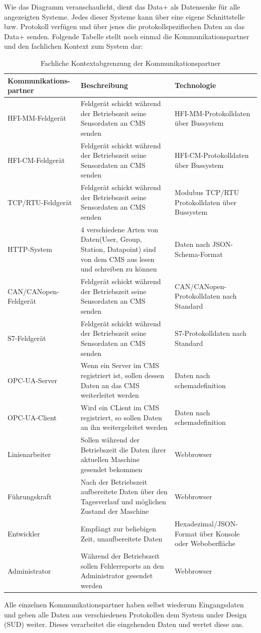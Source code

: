 Wie das Diagramm veranschaulicht, dient das Data+ als Datensenke für alle angezeigten Systeme. Jedes dieser Systeme kann über eine eigene Schnittstelle bzw. Protokoll verfügen und über jenes die protokollspezifischen Daten an das Data+ senden.
Folgende Tabelle stellt noch einmal die Kommunikationspartner und den fachlichen Kontext zum System dar:
\begin{table}[th]
	\begin{tabularx}{\textwidth}{|p{3.5cm}|p{7cm}|X|}
		\hline
		Kommunikations-
		partner & Beschreibung & Technologie \\
		\hline
		HFI-MM-Feldgerät &Feldgerät schickt während der Betriebszeit seine Sensordaten an CMS senden & HFI-MM-Protokolldaten über Bussystem\\
		\hline
		HFI-CM-Feldgerät & Feldgerät schickt während der Betriebszeit seine Sensordaten an CMS senden & HFI-CM-Protokolldaten über Bussystem\\
		\hline
		TCP/RTU-Feldgerät &Feldgerät schickt während der Betriebszeit seine Sensordaten an CMS senden & Modubus TCP/RTU Protokolldaten über Bussystem \\
		\hline
		HTTP-System & 4 verschiedene Arten von Daten(User, Group, Station, Datapoint) sind von dem CMS aus lesen und schreiben zu können & Daten nach JSON-Schema-Format \\
		\hline
		CAN/CANopen-Feldgerät & Feldgerät schickt während der Betriebszeit seine Sensordaten an CMS senden & CAN/CANopen-Protokolldaten nach Standard\\
		\hline
		S7-Feldgerät &Feldgerät schickt während der Betriebszeit seine Sensordaten an CMS senden & S7-Protokolldaten nach Standard\\
		\hline
		OPC-UA-Server & Wenn ein Server im CMS registriert ist, sollen dessen Daten an das CMS weiterleitet werden & Daten nach schemadefinition\\
		\hline
		OPC-UA-Client & Wird ein CLient im CMS registriert, so sollen Daten an ihn weitergeleitet werden & Daten nach schemadefinition\\
		\hline
		Linienarbeiter & Sollen während der Betriebszeit die Daten ihrer aktuellen Maschine gesendet bekommen & Webbrowser\\
		\hline
		Führungskraft & Nach der Betriebszeit aufbereitete Daten über den Tagesverlauf und möglichen Zustand der Maschine & Webbrowser\\
		\hline
		Entwickler & Empfängt zur beliebigen Zeit, unaufbereitete Daten & Hexadezimal/JSON-Format über Konsole oder Weboberfläche\\
		\hline
		Administrator & Während der Betriebszeit sollen Fehlerreports an den Administrator gesendet werden & Webbrowser\\
		\hline
	\end{tabularx} 
	\caption{Fachliche Kontextabgrenzung der Kommunikationspartner}
	\label{tab:FachlicheKontextabgrenzungDerKommunikationspartner}
\end{table}
Alle einzelnen Kommunikationspartner haben selbst wiederum Eingangsdaten und geben alle Daten aus verschiedenen Protokollen dem System under Design (SUD) weiter. Dieses verarbeitet die eingehenden Daten und wertet diese aus.
\clearpage
